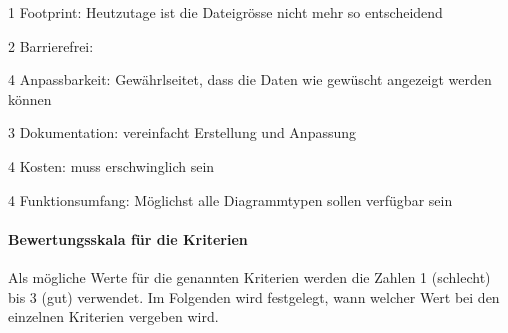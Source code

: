 \begin{itemize*}
\item 1 Footprint: Heutzutage ist die Dateigrösse nicht mehr so entscheidend
\item 2 Barrierefrei:
\item 4 Anpassbarkeit: Gewährlseitet, dass die Daten wie gewüscht angezeigt werden können
\item 3 Dokumentation: vereinfacht Erstellung und Anpassung
\item 4 Kosten: muss erschwinglich sein
\item 4 Funktionsumfang: Möglichst alle Diagrammtypen sollen verfügbar sein
\end{itemize*}


\paragraph*{Bewertungsskala für die Kriterien}
Als mögliche Werte für die genannten Kriterien werden die Zahlen 1 (schlecht) bis 3 (gut) verwendet. Im Folgenden wird festgelegt, wann welcher Wert bei den einzelnen Kriterien vergeben wird.

